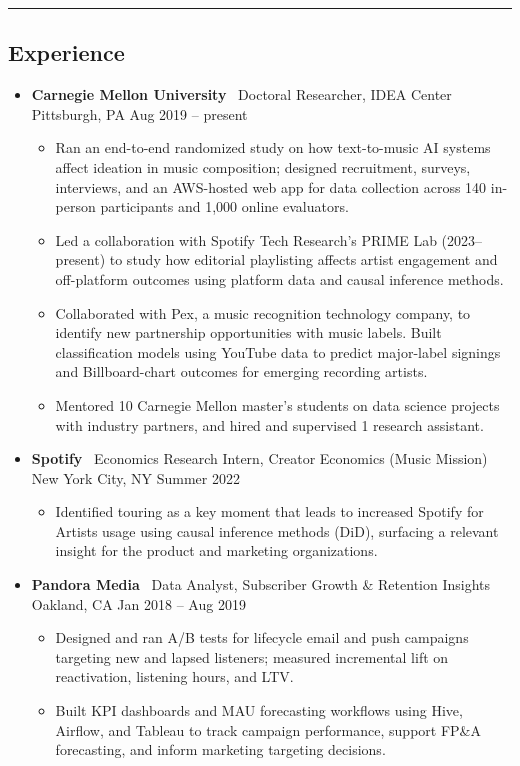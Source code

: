 \documentclass[10pt,letterpaper]{article}
\newcommand{\sep}{{\color{gray}\,\textbullet\,\,}}
\newcommand{\hsep}{\noindent\textcolor{gray}{\rule{\textwidth}{0.5pt}}}
\newcommand{\block}[1]{\begin{samepage}\hsep\subsection*{#1}\end{samepage}}
\begin{document}
\block{Experience}

\begin{itemize}[leftmargin=0pt, label={}, itemsep=4pt]
\item \textbf{Carnegie Mellon University} \sep Doctoral Researcher, IDEA Center \sep Pittsburgh, PA \hfill Aug 2019 -- present
  \begin{itemize}
  \item Ran an end-to-end randomized study on how text-to-music AI systems affect ideation in music composition; designed recruitment, surveys, interviews, and an AWS-hosted web app for data collection across 140 in-person participants and 1{,}000 online evaluators.
  \item Led a collaboration with Spotify Tech Research's PRIME Lab (2023--present) to study how editorial playlisting affects artist engagement and off-platform outcomes using platform data and causal inference methods.
  \item Collaborated with Pex, a music recognition technology company, to identify new partnership opportunities with music labels. Built classification models using YouTube data to predict major-label signings and Billboard-chart outcomes for emerging recording artists.
  \item Mentored 10 Carnegie Mellon master's students on data science projects with industry partners, and hired and supervised 1 research assistant.
  \end{itemize}
\item \textbf{Spotify} \sep Economics Research Intern, Creator Economics (Music Mission) \sep New York City, NY \hfill Summer 2022
  \begin{itemize}
  \item Identified touring as a key moment that leads to increased Spotify for Artists usage using causal inference methods (DiD), surfacing a relevant insight for the product and marketing organizations.
  \end{itemize}
\item \textbf{Pandora Media} \sep Data Analyst, Subscriber Growth \& Retention Insights \sep Oakland, CA \hfill Jan 2018 -- Aug 2019
  \begin{itemize}
  \item Designed and ran A/B tests for lifecycle email and push campaigns targeting new and lapsed listeners; measured incremental lift on reactivation, listening hours, and LTV.
  \item Built KPI dashboards and MAU forecasting workflows using Hive, Airflow, and Tableau to track campaign performance, support FP\&A forecasting, and inform marketing targeting decisions.

\end{itemize}
\end{itemize}
\end{document}
